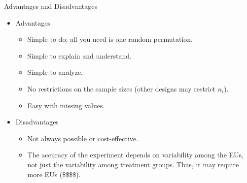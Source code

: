 \begin{frame}[allowframebreaks]{Advantages and Disadvantages}
  \begin{itemize}
    \item Advantages
    \begin{itemize}
      \item Simple to do; all you need is one random permutation.
      \item Simple to explain and understand.
      \item Simple to analyze.
      \item No restrictions on the sample sizes (other designs may restrict $n_i$).
      \item Easy with missing values.
    \end{itemize}
    \item Disadvantages
    \begin{itemize}
      \item Not always possible or cost-effective.
      \item The accuracy of the experiment depends on variability among the EUs, not just the variability among treatment groups. Thus, it may require more EUs (\$\$\$\$).
    \end{itemize}
  \end{itemize}
\end{frame}

